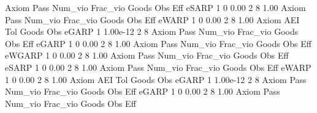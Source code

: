 {\smallskip}
{\smallskip}
{\smallskip}
       Axiom {\VBAR} Pass     Num_vio    Frac_vio       Goods         Obs         Eff  
       eSARP {\VBAR}    1           0        0.00           2           8        1.00  
{\smallskip}
{\smallskip}
{\smallskip}
       Axiom {\VBAR} Pass     Num_vio    Frac_vio       Goods         Obs         Eff  
       eWARP {\VBAR}    1           0        0.00           2           8        1.00  
{\smallskip}
       Axiom {\VBAR}       AEI        Tol      Goods        Obs 
       eGARP {\VBAR}         1   1.00e-12          2          8 
{\smallskip}
{\smallskip}
{\smallskip}
       Axiom {\VBAR} Pass     Num_vio    Frac_vio       Goods         Obs         Eff  
       eGARP {\VBAR}    1           0        0.00           2           8        1.00  
{\smallskip}
{\smallskip}
{\smallskip}
       Axiom {\VBAR} Pass     Num_vio    Frac_vio       Goods         Obs         Eff  
      eWGARP {\VBAR}    1           0        0.00           2           8        1.00  
{\smallskip}
{\smallskip}
{\smallskip}
       Axiom {\VBAR} Pass     Num_vio    Frac_vio       Goods         Obs         Eff  
       eSARP {\VBAR}    1           0        0.00           2           8        1.00  
{\smallskip}
{\smallskip}
{\smallskip}
       Axiom {\VBAR} Pass     Num_vio    Frac_vio       Goods         Obs         Eff  
       eWARP {\VBAR}    1           0        0.00           2           8        1.00  
{\smallskip}
       Axiom {\VBAR}       AEI        Tol      Goods        Obs 
       eGARP {\VBAR}         1   1.00e-12          2          8 
{\smallskip}
{\smallskip}
{\smallskip}
       Axiom {\VBAR} Pass     Num_vio    Frac_vio       Goods         Obs         Eff  
       eGARP {\VBAR}    1           0        0.00           2           8        1.00  
{\smallskip}
{\smallskip}
{\smallskip}
       Axiom {\VBAR} Pass     Num_vio    Frac_vio       Goods         Obs         Eff  
